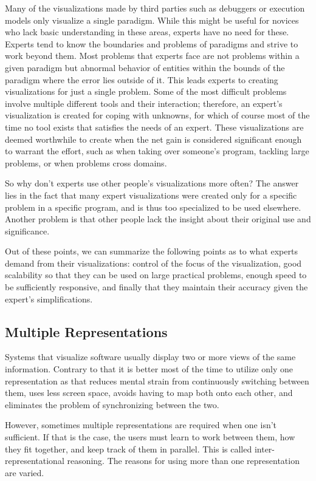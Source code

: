 \documentclass[11pt, a4paper, ngerman, twoside]{article}
\theoremstyle{plain}\newtheorem{Lemma}{Lemma}
\theoremstyle{plain}\newtheorem{Satz}[Lemma]{Satz}
\theoremstyle{definition}\newtheorem{Definition}[Lemma]{Definition}
\theoremstyle{definition}\newtheorem*{Beispiel}{Beispiel}
\theoremstyle{remark}\newtheorem*{Bemerkung}{Bemerkung}
\begin{document}
Many of the visualizations made by third parties such as debuggers or execution models only visualize a single paradigm. While this might be useful for novices who lack basic understanding in these areas, experts have no need for these. Experts tend to know the boundaries and problems of paradigms and strive to work beyond them. Most problems that experts face are not problems within a given paradigm but abnormal behavior of entities within the bounds of the paradigm where the error lies outside of it. This leads experts to creating visualizations for just a single problem. Some of the most difficult problems involve multiple different tools and their interaction; therefore, an expert's visualization is created for coping with unknowns, for which of course most of the time no tool exists that satisfies the needs of an expert. These visualizations are deemed worthwhile to create when the net gain is considered significant enough to warrant the effort, such as when taking over someone's program, tackling large problems, or when problems cross domains.

So why don't experts use other people's visualizations more often? The answer lies in the fact that many expert visualizations were created only for a specific problem in a specific program, and is thus too specialized to be used elsewhere. Another problem is that other people lack the insight about their original use and significance.

Out of these points, we can summarize the following points as to what experts demand from their visualizations: control of the focus of the visualization, good scalability so that they can be used on large practical problems, enough speed to be sufficiently responsive, and finally that they maintain their accuracy given the expert's simplifications.

\subsection{Multiple Representations}

Systems that visualize software usually display two or more views of the same information. Contrary to that it is better most of the time to utilize only one representation as that reduces mental strain from continuously switching between them, uses less screen space, avoids having to map both onto each other, and eliminates the problem of synchronizing between the two.

However, sometimes multiple representations are required when one isn't sufficient. If that is the case, the users must learn to work between them, how they fit together, and keep track of them in parallel. This is called inter-representational reasoning. The reasons for using more than one representation are varied.
\end{document}
